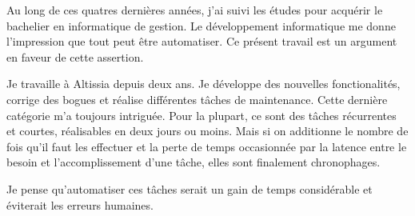 Au long de ces quatres dernières années, j'ai suivi les études pour acquérir le bachelier en informatique de gestion.
Le développement informatique me donne l'impression que tout peut être automatiser.
Ce présent travail est un argument en faveur de cette assertion.

Je travaille à Altissia depuis deux ans.
Je développe des nouvelles fonctionalités, corrige des bogues et réalise différentes tâches de maintenance.
Cette dernière catégorie m'a toujours intriguée.
Pour la plupart, ce sont des tâches récurrentes et courtes, réalisables en deux jours ou moins.
Mais si on additionne le nombre de fois qu'il faut les effectuer et la perte de temps occasionnée par la latence entre le
besoin et l'accomplissement d'une tâche, elles sont finalement chronophages.

Je pense qu'automatiser ces tâches serait un gain de temps considérable et éviterait les erreurs humaines.

